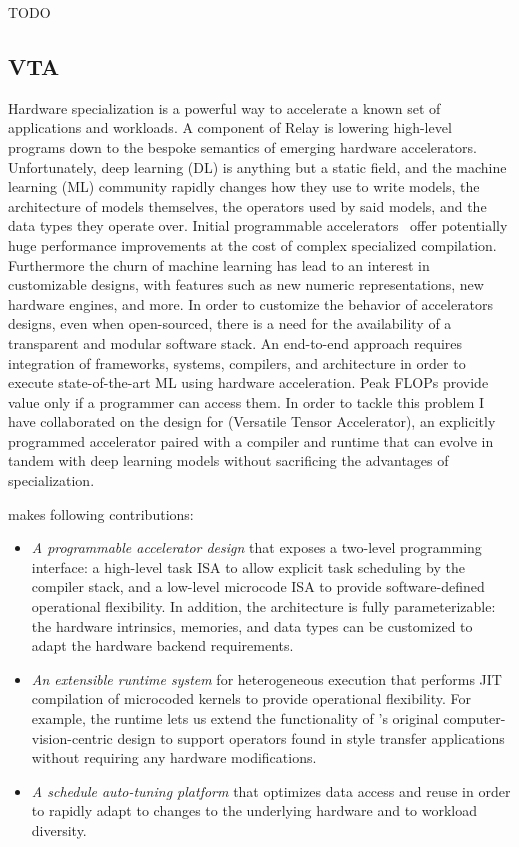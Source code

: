 TODO

\subsection{VTA}
\label{sec:vta}

Hardware specialization is a powerful way to accelerate
  a known set of applications and workloads.
A component of Relay is lowering high-level programs down
  to the bespoke semantics of emerging hardware accelerators.
Unfortunately, deep learning (DL) is anything but a static field, and the machine learning (ML) community
  rapidly changes how they use to write models, the architecture of models themselves, the operators
  used by said models, and the data types they operate over.
Initial programmable accelerators~\citep{tpuv1} offer potentially huge performance
  improvements at the cost of complex specialized compilation.
Furthermore the churn of machine learning has lead to an interest
  in customizable designs, with features such as new numeric representations,
  new hardware engines, and more.
In order to customize the behavior of accelerators designs, even when open-sourced,
  there is a need for the availability of a transparent and modular software stack.
An end-to-end approach requires integration of frameworks, systems, compilers,
  and architecture in order to execute state-of-the-art ML using hardware acceleration.
Peak FLOPs provide value only if a programmer can access them.
In order to tackle this problem I have collaborated on the design for \vta (Versatile Tensor Accelerator),
  an explicitly programmed accelerator paired with a compiler and runtime that can evolve
  in tandem with deep learning models without sacrificing the advantages of specialization.

\vta makes following contributions:

\begin{itemize}
    \item \emph{A programmable accelerator design} that exposes a two-level programming interface: a high-level task ISA to allow explicit task scheduling by the compiler stack, and a low-level microcode ISA to provide software-defined operational flexibility.
    In addition, the \vta architecture is fully parameterizable: the hardware intrinsics, memories, and data types can be customized to adapt the hardware backend requirements.
    \item \emph{An extensible runtime system} for heterogeneous execution that performs JIT compilation of microcoded kernels to provide operational flexibility. For example, the \vta runtime lets us extend the functionality of \vta's original computer-vision-centric design to support operators found in style transfer applications without requiring any hardware modifications.
    \item \emph{A schedule auto-tuning platform} that optimizes data access and reuse in order to rapidly adapt to changes to the underlying hardware and to workload diversity.
\end{itemize}

